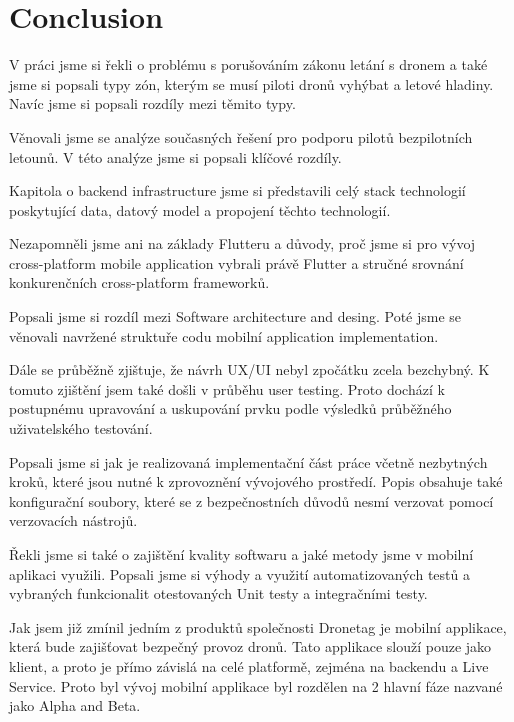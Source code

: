 \chapter{Conclusion}\label{ch:conclusion}
V práci jsme si řekli o problému s porušováním zákonu letání s dronem a také jsme si popsali typy zón, kterým se musí piloti dronů vyhýbat a letové hladiny.
Navíc jsme si popsali rozdíly mezi těmito typy.

Věnovali jsme se analýze současných řešení pro podporu pilotů bezpilotních letounů.
V této analýze jsme si popsali klíčové rozdíly.

Kapitola o backend infrastructure jsme si představili celý stack technologií poskytující data, datový model a propojení těchto technologií.

Nezapomněli jsme ani na základy Flutteru a důvody, proč jsme si pro vývoj cross-platform mobile application vybrali právě Flutter a stručné srovnání konkurenčních cross-platform frameworků.

Popsali jsme si rozdíl mezi Software architecture and desing.
Poté jsme se věnovali navržené struktuře codu mobilní application implementation.

Dále se průběžně zjištuje, že návrh UX/UI nebyl zpočátku zcela bezchybný.
K tomuto zjištění jsem také došli v průběhu user testing.
Proto dochází k postupnému upravování a uskupování prvku podle výsledků průběžného uživatelského testování.

Popsali jsme si jak je realizovaná implementační část práce včetně nezbytných kroků, které jsou nutné k zprovoznění vývojového prostředí.
Popis obsahuje také konfigurační soubory, které se z bezpečnostních důvodů nesmí verzovat pomocí verzovacích nástrojů.

Řekli jsme si také o zajištění kvality softwaru a jaké metody jsme v mobilní aplikaci využili.
Popsali jsme si výhody a využití automatizovaných testů a vybraných funkcionalit otestovaných Unit testy a integračními testy.

Jak jsem již zmínil jedním z produktů společnosti Dronetag je mobilní applikace, která bude zajišťovat bezpečný provoz dronů.
Tato applikace slouží pouze jako klient, a proto je přímo závislá na celé platformě, zejména na backendu a Live Service.
Proto byl vývoj mobilní applikace byl rozdělen na 2 hlavní fáze nazvané jako Alpha and Beta.

